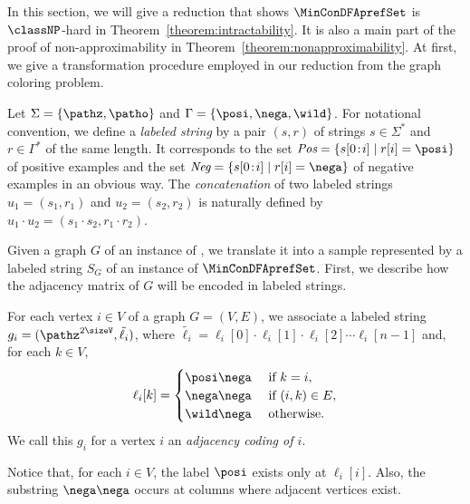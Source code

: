 

In this section, we will give a reduction that shows $\MinConDFAprefSet$ is $\classNP$-hard in Theorem~\ref{theorem:intractability}.
It is also a main part of the proof of non-approximability in Theorem~\ref{theorem:nonapproximability}.
At first, we give a transformation procedure employed in our reduction from the graph coloring problem.

Let $\Sigma = \{\pathz, \patho\}$ and $\Gamma = \{\posi, \nega,\wild\}$.
For notational convention, we define a {\em labeled string} by 
a pair $(s,r)$ of strings $s \in \Sigma^*$ and $r \in \Gamma^*$ of the same
length.
It corresponds to the set $\textit{Pos} = \{ s[0\!:\!i] \mid r[i] = \posi\}$ 
of positive examples and the set 
$\textit{Neg} = \{ s[0\!:\!i] \mid r[i] = \nega\}$ of negative examples in an
obvious way.
The {\em concatenation} of two labeled strings $u_1 = (s_1,r_1)$ and
$u_2 = (s_2,r_2)$ is
naturally defined by $u_1\!\cdot\!u_2 = (s_1\!\cdot\! s_2,r_1\!\cdot\! r_2)$.

Given a graph $G$ of an instance of \MinGC, 
we translate it into a sample represented by a labeled string $S_G$ of an instance of $\MinConDFAprefSet$.
First, we describe how the adjacency matrix of $G$ will be encoded in labeled strings. 

For each vertex $i\in V$ of a graph $G=(V,E)$, we associate a labeled
string $g_i = (\pathz^{2\sizeV}, \tilde{\ell_i})$, where $ \tilde{\ell_i} = \ell_i[0]\cdot \ell_i[1]\cdot\ell_i[2]\cdots
\ell_i[n-1]$ and, for each $k \in V$, 
\[
\ell_i[k] = 
\begin{cases}
\posi\nega & \mbox{ if $k=i$},\\
\nega\nega & \mbox{ if $(i, k) \in E$},\\
\wild\nega & \mbox{ otherwise. }
\end{cases}
\]
%
We call this $g_i$ for a vertex $i$ an {\em adjacency coding of $i$}. 

Notice that, for each $i \in V$, the label $\posi$ exists only at $\ell_i[i]$. 
Also, the substring $\nega\nega$ occurs at columns where adjacent vertices exist. 

